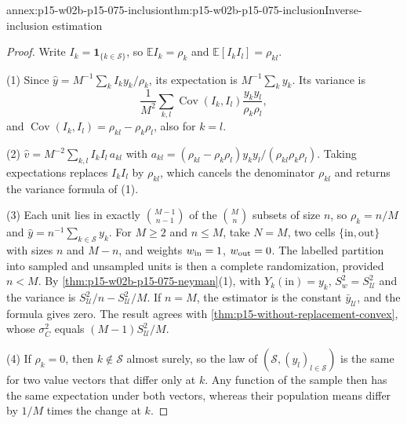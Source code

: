 \begin{annexitem}{annex:p15-w02b-p15-075-inclusion}{thm:p15-w02b-p15-075-inclusion}{Inverse-inclusion estimation}
\begin{proof}
Write \(I_k=\mathbf1_{\{k\in\mathcal S\}}\), so \(\mathbb EI_k=\rho_k\) and
\(\mathbb E[I_kI_l]=\rho_{kl}\).

(1) Since \(\widehat y=M^{-1}\sum_kI_ky_k/\rho_k\), its expectation is
\(M^{-1}\sum_ky_k\). Its variance is
\[
 \frac1{M^2}\sum_{k,l}\operatorname{Cov}(I_k,I_l)\frac{y_ky_l}{\rho_k\rho_l},
\]
and \(\operatorname{Cov}(I_k,I_l)=\rho_{kl}-\rho_k\rho_l\), also for \(k=l\).

(2) \(\widehat v=M^{-2}\sum_{k,l}I_kI_l\,a_{kl}\) with
\(a_{kl}=(\rho_{kl}-\rho_k\rho_l)y_ky_l/(\rho_{kl}\rho_k\rho_l)\). Taking
expectations replaces \(I_kI_l\) by \(\rho_{kl}\), which cancels the
denominator \(\rho_{kl}\) and returns the variance formula of (1).

(3) Each unit lies in exactly \(\binom{M-1}{n-1}\) of the
\(\binom Mn\) subsets of size \(n\), so \(\rho_k=n/M\) and
\(\widehat y=n^{-1}\sum_{k\in\mathcal S}y_k\). For \(M\geq2\) and
\(n\leq M\), take \(N=M\), two cells \(\{\mathrm{in},\mathrm{out}\}\) with
sizes \(n\) and \(M-n\), and weights \(w_{\rm in}=1\), \(w_{\rm out}=0\).
The labelled partition into sampled and unsampled units is then a complete
randomization, provided \(n<M\). By
\cref{thm:p15-w02b-p15-075-neyman}(1), with \(Y_k(\mathrm{in})=y_k\),
\(S_w^2=S_{\mathcal U}^2\) and the variance is
\(S_{\mathcal U}^2/n-S_{\mathcal U}^2/M\). If \(n=M\), the estimator is the
constant \(\bar y_{\mathcal U}\), and the formula gives zero. The result agrees
with \cref{thm:p15-without-replacement-convex}, whose \(\sigma_C^2\) equals
\((M-1)S_{\mathcal U}^2/M\).

(4) If \(\rho_k=0\), then \(k\notin\mathcal S\) almost surely, so the law of
\((\mathcal S,(y_l)_{l\in\mathcal S})\) is the same for two value vectors that
differ only at \(k\). Any function of the sample then has the same expectation
under both vectors, whereas their population means differ by \(1/M\) times the
change at \(k\).
\end{proof}
\end{annexitem}

